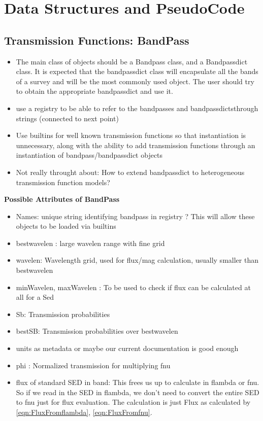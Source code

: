 \documentclass{article}[12pt]
\begin{document}
\section{Data Structures and PseudoCode}
\subsection{Transmission Functions: BandPass} 
\begin{itemize}
    \item The main class of objects should be a Bandpass class, and a Bandpassdict class. It is expected that the bandpassdict class will encapsulate all the bands of a survey and will be the most commonly used object. The user should try to obtain the appropriate bandpassdict and use it.
    \item use a registry to be able to refer to the bandpasses and bandpassdictsthrough strings (connected to next point)
    \item Use builtins for well known transmission functions so that instantiation is unnecessary, along with the ability to add transmission functions through an instantiation of bandpass/bandpassdict objects
    \item Not really throught about: How to extend bandpassdict to heterogeneous transmission function models?
\end{itemize}
\textbf{Possible Attributes of BandPass}
\begin{itemize}
    \item Names: unique string identifying bandpass in registry ? This will allow these objects to be loaded via builtins
    \item bestwavelen : large wavelen range with fine grid 
    \item wavelen: Wavelength grid, used for flux/mag calculation, usually smaller than bestwavelen
    \item minWavelen, maxWavelen : To be used to check if flux can be calculated at all for a Sed
    \item Sb: Transmission  probabilities
    \item bestSB: Transmission probabilities over bestwavelen
    \item units as metadata or maybe our current documentation is good enough
    \item phi : Normalized transmission for multiplying fnu 
    \item flux of standard SED in band: This frees us up to calculate in flambda or fnu. So if we read in the SED in flambda, we don't need to convert the entire SED to fnu just for flux evaluation. The calculation is just Flux 
        as calculated by \ref{eqn:FluxFromflambda}, \ref{eqn:FluxFromfnu}. 
\end{itemize}
\end{document}
